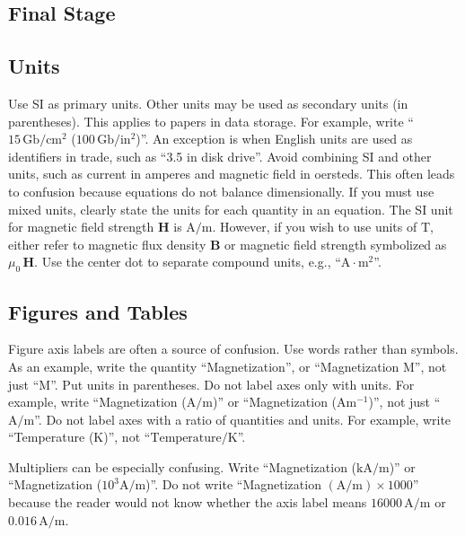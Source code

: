 \documentclass{ifacconf}
\begin{document}
\subsection{Final Stage}

\subsection{Units}

Use SI as primary units. Other units may be used as secondary units
(in parentheses). This applies to papers in data storage. For example,
write ``$15\,\mathrm{Gb}/\mathrm{cm}^2$ ($100\,\mathrm{Gb}/\mathrm{in}^2$)''. 
An exception is when
English units are used as identifiers in trade, such as ``3.5 in
disk drive''. Avoid combining SI and other units, such as current in
amperes and magnetic field in oersteds. This often leads to confusion
because equations do not balance dimensionally. If you must use mixed
units, clearly state the units for each quantity in an equation.  The
SI unit for magnetic field strength $\mathbf{H}$ is $\mathrm{A}/\mathrm{m}$. However, if you wish to
use units of $\mathrm{T}$, either refer to magnetic flux density $\mathbf{B}$ or
magnetic field strength symbolized as $\mu_0\,\mathbf{H}$. Use the center dot to
separate compound units, e.g., ``$\mathrm{A} \cdot \mathrm{m}^2$''.

\subsection{Figures and Tables}

Figure axis labels are often a source of confusion. Use words rather
than symbols. As an example, write the quantity ``Magnetization'', or
``Magnetization M'', not just ``M''. Put units in parentheses. Do not
label axes only with units.  For example, write ``Magnetization
($\mathrm{A}/\mathrm{m}$)'' or ``Magnetization ($\mathrm{A} \mathrm{m}^{-1}$)'', not just
 ``$\mathrm{A}/\mathrm{m}$''. Do not
label axes with a ratio of quantities and units. For example, write
``Temperature ($\mathrm{K}$)'', not ``$\mbox{Temperature}/\mathrm{K}$''.

Multipliers can be especially confusing. Write ``Magnetization
($\mathrm{kA}/\mathrm{m}$)'' or ``Magnetization ($10^3 \mathrm{A}/\mathrm{m}$)''. Do not write
``Magnetization $(\mathrm{A}/\mathrm{m}) \times 1000$'' because the reader would not know
whether the axis label means $16000\,\mathrm{A}/\mathrm{m}$ or $0.016\,\mathrm{A}/\mathrm{m}$.
\end{document}
